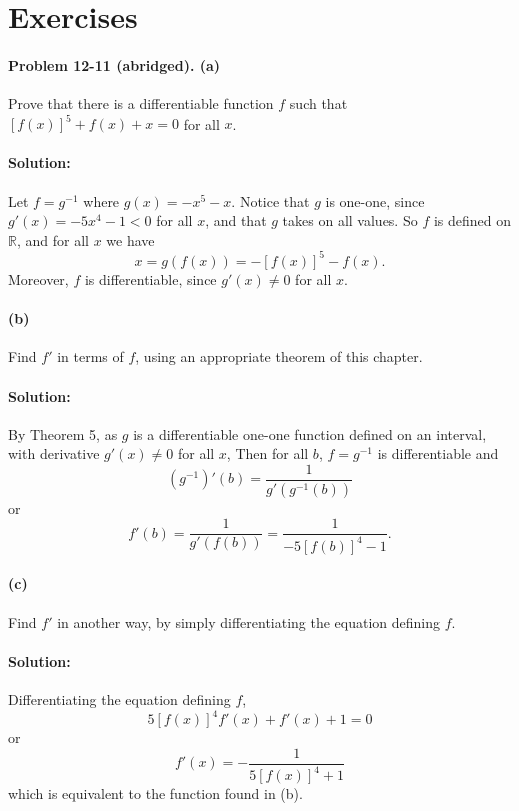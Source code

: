 \documentclass{article}
\begin{document}
\section*{Exercises}

\paragraph{Problem 12-11 (abridged). (a)} Prove that there is a differentiable
function $f$ such that $[f(x)]^5 + f(x) + x = 0$ for all $x$.

\paragraph{Solution:} Let $f = g^{-1}$ where $g(x) = -x^5 - x$. Notice that $g$
is one-one, since $g'(x) = -5x^4 - 1 < 0$ for all $x$, and that $g$ takes on
all values. So $f$ is defined on $\mathbb{R}$, and for all $x$ we have
\begin{equation*}
  x = g(f(x)) = -[f(x)]^5 - f(x).
\end{equation*} Moreover, $f$ is differentiable, since $g'(x) \neq 0$ for all
$x$.

\paragraph{(b)} Find $f'$ in terms of $f$, using an appropriate theorem of this
chapter.

\paragraph{Solution:} By Theorem 5, as $g$ is a differentiable one-one function
defined on an interval, with derivative $g'(x) \neq 0$ for all $x$, Then for
all $b$, $f = g^{-1}$ is differentiable and \begin{equation*}
  (g^{-1})'(b) = \frac{1}{g'(g^{-1}(b))}
\end{equation*} or \begin{equation*}
  f'(b) = \frac{1}{g'(f(b))} = \frac{1}{-5[f(b)]^4 - 1}.
\end{equation*}

\paragraph{(c)} Find $f'$ in another way, by simply differentiating the
equation defining $f$.

\paragraph{Solution:} Differentiating the equation defining $f$,
\begin{equation*}
  5[f(x)]^4f'(x) + f'(x) + 1 = 0
\end{equation*} or \begin{equation*}
  f'(x) = -\frac{1}{5[f(x)]^4 + 1}
\end{equation*} which is equivalent to the function found in (b).
\end{document}
